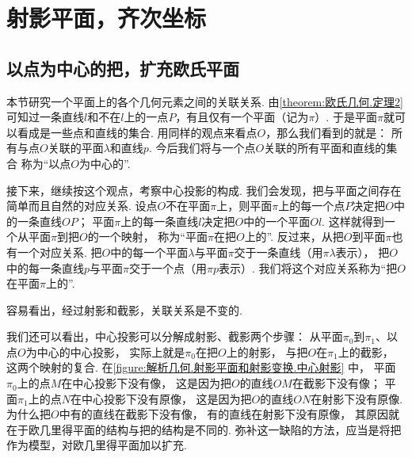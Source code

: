 \section{射影平面，齐次坐标}
\subsection{以点为中心的把，扩充欧氏平面}
本节研究一个平面上的各个几何元素之间的关联关系.
由\cref{theorem:欧氏几何.定理2}
可知过一条直线\(l\)和不在\(l\)上的一点\(P\)，有且仅有一个平面（记为\(\pi\)）.
于是平面\(\pi\)就可以看成是一些点和直线的集合.
用同样的观点来看点\(O\)，那么我们看到的就是：
所有与点\(O\)关联的平面\(\lambda\)和直线\(p\).
今后我们将与一个点\(O\)关联的所有平面和直线的集合
称为“以点\(O\)为中心的”.

接下来，继续按这个观点，考察中心投影的构成.
我们会发现，把与平面之间存在简单而且自然的对应关系.
设点\(O\)不在平面\(\pi\)上，则平面\(\pi\)上的每一个点\(P\)决定把\(O\)中的一条直线\(OP\)；
平面\(\pi\)上的每一条直线\(l\)决定把\(O\)中的一个平面\(Ol\).
这样就得到一个从平面\(\pi\)到把\(O\)的一个映射，
称为“平面\(\pi\)在把\(O\)上的”.
反过来，从把\(O\)到平面\(\pi\)也有一个对应关系.
把\(O\)中的每一个平面\(\lambda\)与平面\(\pi\)交于一条直线（用\(\pi\lambda\)表示），
把\(O\)中的每一条直线\(p\)与平面\(\pi\)交于一个点（用\(\pi p\)表示）.
我们将这个对应关系称为“把\(O\)在平面\(\pi\)上的”.

容易看出，经过射影和截影，关联关系是不变的.

我们还可以看出，中心投影可以分解成射影、截影两个步骤：
从平面\(\pi_0\)到\(\pi_1\)、以点\(O\)为中心的中心投影，
实际上就是\(\pi_0\)在把\(O\)上的射影，
与把\(O\)在\(\pi_1\)上的截影，
这两个映射的复合.
在\cref{figure:解析几何.射影平面和射影变换.中心射影} 中，
平面\(\pi_0\)上的点\(M\)在中心投影下没有像，
这是因为把\(O\)的直线\(OM\)在截影下没有像；
平面\(\pi_1\)上的点\(N\)在中心投影下没有原像，
这是因为把\(O\)的直线\(ON\)在射影下没有原像.
为什么把\(O\)中有的直线在截影下没有像，
有的直线在射影下没有原像，
其原因就在于欧几里得平面的结构与把的结构是不同的.
弥补这一缺陷的方法，应当是将把作为模型，对欧几里得平面加以扩充.


